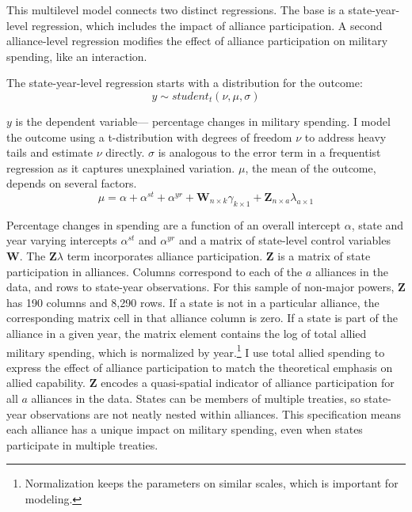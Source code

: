 \documentclass[12pt]{article}
\begin{document}
This multilevel model connects two distinct regressions. 
The base is a state-year-level regression, which includes the impact of alliance participation.
A second alliance-level regression modifies the effect of alliance participation on military spending, like an interaction. 


The state-year-level regression starts with a distribution for the outcome:
\begin{equation}
y \sim student_t(\nu, \mu, \sigma)
\end{equation}
 

$y$ is the dependent variable--- percentage changes in military spending. 
I model the outcome using a t-distribution with degrees of freedom $\nu$ to address heavy tails and estimate $\nu$ directly.
$\sigma$ is analogous to the error term in a frequentist regression as it captures unexplained variation.  
$\mu$, the mean of the outcome, depends on several factors.
\begin{equation}
\mu = \alpha + \alpha^{st} + \alpha^{yr} +\textbf{W}_{n \times k} \gamma_{k \times 1}  + \textbf{Z}_{n \times a} \lambda_{a \times 1} 
\end{equation}


Percentage changes in spending are a function of an overall intercept $\alpha$, state and year varying intercepts $\alpha^{st}$ and $\alpha^{yr}$ and a matrix of state-level control variables $\textbf{W}$.
The $\textbf{Z} \lambda$ term incorporates alliance participation.
$\textbf{Z}$ is a matrix of state participation in alliances. 
Columns correspond to each of the $a$ alliances in the data, and rows to state-year observations. 
For this sample of non-major powers, $\textbf{Z}$ has 190 columns and 8,290 rows. 
If a state is not in a particular alliance, the corresponding matrix cell in that alliance column is zero.
If a state is part of the alliance in a given year, the matrix element contains the log of total allied military spending, which is normalized by year.\footnote{Normalization keeps the parameters on similar scales, which is important for modeling.} %
I use total allied spending to express the effect of alliance participation to match the theoretical emphasis on allied capability. 
$\textbf{Z}$ encodes a quasi-spatial indicator of alliance participation for all $a$ alliances in the data. 
States can be members of multiple treaties, so state-year observations are not neatly nested within alliances. 
This specification means each alliance has a unique impact on military spending, even when states participate in multiple treaties. 
\end{document}
